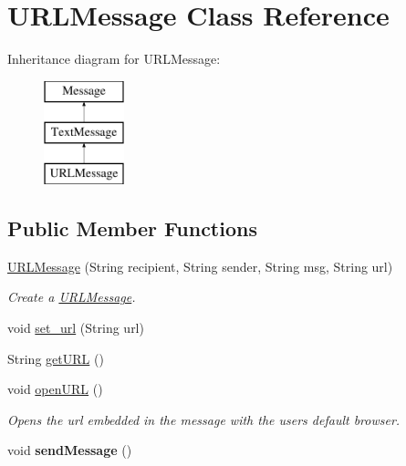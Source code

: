 \hypertarget{class_u_r_l_message}{}\section{U\+R\+L\+Message Class Reference}
\label{class_u_r_l_message}
Inheritance diagram for U\+R\+L\+Message\+:\begin{figure}[H]
\begin{center}
\leavevmode
\includegraphics[height=3.000000cm]{class_u_r_l_message}
\end{center}
\end{figure}
\subsection*{Public Member Functions}
\begin{DoxyCompactItemize}
\item 
\mbox{\label{class_u_r_l_message_a277e910970a76bf04a5c64ad7d41c0b6}} 
\hyperlink{class_u_r_l_message_a277e910970a76bf04a5c64ad7d41c0b6}{U\+R\+L\+Message} (String recipient, String sender, String msg, String url)
\begin{DoxyCompactList}\small\item\em Create a \hyperlink{class_u_r_l_message}{U\+R\+L\+Message}. \end{DoxyCompactList}\item 
void \hyperlink{class_u_r_l_message_a2056536ac32514f5f41ba8c6b4e4f66d}{set\+\_\+url} (String url)
\item 
String \hyperlink{class_u_r_l_message_a9c2a3498360de3e3cc50cfe91b732f11}{get\+U\+RL} ()
\item 
\mbox{\label{class_u_r_l_message_a403528f2856ab482e8b532de0cb9d68f}} 
void \hyperlink{class_u_r_l_message_a403528f2856ab482e8b532de0cb9d68f}{open\+U\+RL} ()
\begin{DoxyCompactList}\small\item\em Opens the url embedded in the message with the users default browser. \end{DoxyCompactList}\item 
\mbox{\label{class_u_r_l_message_a35cd7dac3ad9536b90f46c80f0aa92bf}} 
void {\bfseries send\+Message} ()
\end{DoxyCompactItemize}
